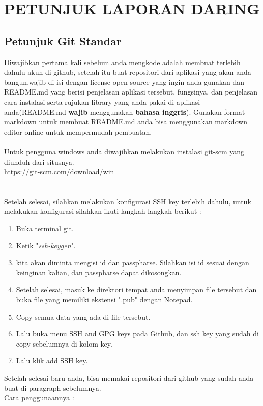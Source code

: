 \chapter{PETUNJUK LAPORAN DARING}
\section{Petunjuk Git Standar}
Diwajibkan pertama kali sebelum anda mengkode adalah membuat terlebih dahulu akun di github, setelah itu buat repositori dari aplikasi yang akan anda bangun,wajib di isi dengan license open source yang ingin anda gunakan dan README.md yang berisi penjelasan aplikasi tersebut, fungsinya, dan penjelasan cara instalasi serta rujukan library yang anda pakai
di aplikasi anda(README.md \textbf{wajib} menggunakan \textbf{bahasa inggris}). Gunakan format markdown untuk membuat README.md anda bisa menggunakan markdown editor online untuk mempermudah pembuatan.
\\
\\
Untuk pengguna windows anda diwajibkan melakukan instalasi git-scm yang diunduh dari situsnya.\\
\url{https://git-scm.com/download/win}\\
\\
\\
Setelah selesai, silahkan melakukan konfigurasi SSH key terlebih dahulu,
untuk melakukan konfigurasi silahkan ikuti langkah-langkah berikut :
\begin{enumerate}
\item Buka terminal git.
\item Ketik "\textit{ssh-keygen}".
\item kita akan diminta mengisi id dan passpharse. Silahkan isi id sesuai dengan keinginan kalian, dan passpharse dapat dikosongkan.
\item Setelah selesai, masuk ke direktori tempat anda menyimpan file tersebut dan buka file yang memiliki ekstensi ".pub" dengan Notepad.
\item Copy semua data yang ada di file tersebut.
\item Lalu buka menu SSH and GPG keys pada Github, dan ssh key yang sudah di copy sebelumnya di kolom key.
\item Lalu klik add SSH key.
\end{enumerate}
Setelah selesai baru anda, bisa memakai repositori dari github yang sudah anda buat di paragraph sebelumnya.\\
Cara penggunaannya :
